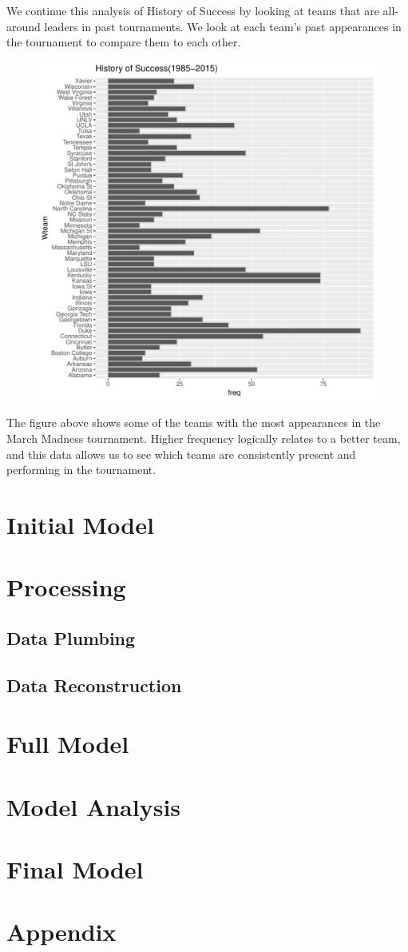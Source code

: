 \documentclass[]{scrartcl}
\begin{document}
We continue this analysis of History of Success by looking at teams that are all-around leaders in past tournaments. We look at each team's past appearances in the tournament to compare them to each other.
\begin{figure}[H]
	\centering
	\includegraphics[scale=.5]{HistOfSuccess2.pdf}
\end{figure}
The figure above shows some of the teams with the most appearances in the March Madness tournament. Higher frequency logically relates to a better team, and this data allows us to see which teams are consistently present and performing in the tournament.

\section*{Initial Model}
\section*{Processing}
\subsection*{Data Plumbing}
\subsection*{Data Reconstruction}
\section*{Full Model}
\section*{Model Analysis}
\section*{Final Model}
\section*{Appendix}
\end{document}
